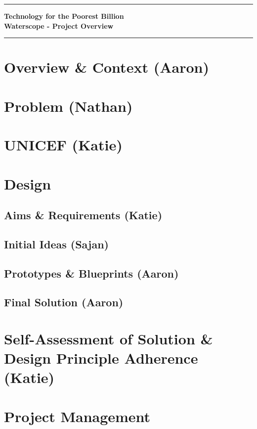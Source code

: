 \documentclass[12pt]{article}
\begin{document}
\noindent

\begin{center}
\rule{15.7cm}{0.5mm}
{\bf Technology for the Poorest Billion}\\
\vspace{0.5cm} {\bf Waterscope - Project Overview}\\
\rule{15.7cm}{0.5mm}
\end{center}

\section{Overview \& Context (Aaron)}
\section{Problem (Nathan)}
\section{UNICEF (Katie)}
\section{Design}
\subsection{Aims \& Requirements (Katie)}

\subsection{Initial Ideas (Sajan)}

\subsection{Prototypes \& Blueprints (Aaron)}

\subsection{Final Solution (Aaron)}

\section{Self-Assessment of Solution \& Design Principle Adherence (Katie)}
\section{Project Management}
\end{document}
